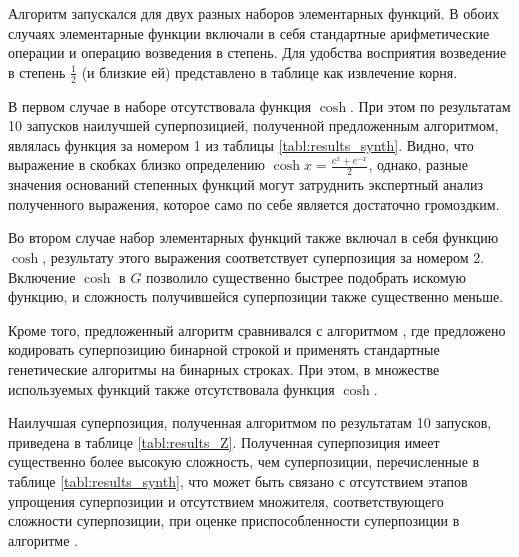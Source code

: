 \documentclass[12pt,a4paper]{article}
\begin{document}
Алгоритм запускался для двух разных наборов элементарных функций.
В обоих случаях элементарные функции включали в себя стандартные арифметические операции и
операцию возведения в степень. Для удобства восприятия возведение в степень
$\frac{1}{2}$ (и близкие ей) представлено в таблице как извлечение корня.

В первом случае в наборе отсутствовала функция $\cosh$. При этом по результатам
10 запусков наилучшей суперпозицией, полученной предложенным алгоритмом,
являлась функция за номером 1 из таблицы \ref{tabl:results_synth}. Видно, что выражение
в скобках близко определению $\cosh x = \frac{e^x + e^{-x}}{2}$,
однако, разные значения оснований степенных функций могут затруднить экспертный
анализ полученного выражения, которое само по себе является достаточно громоздким.

Во втором случае набор элементарных функций также включал в себя функцию
$\cosh$, результату этого выражения соответствует суперпозиция за номером 2.
Включение $\cosh$ в $G$ позволило существенно быстрее подобрать искомую функцию, и сложность
получившейся суперпозиции также существенно меньше.

Кроме того, предложенный алгоритм сравнивался с алгоритмом \cite{Zelinka2008},
где предложено кодировать суперпозицию бинарной строкой и применять стандартные
генетические алгоритмы на бинарных строках. При этом, в множестве используемых
функций также отсутствовала функция $\cosh$.

Наилучшая суперпозиция, полученная алгоритмом \cite{Zelinka2008} по результатам
10 запусков, приведена в таблице \ref{tabl:results_Z}. Полученная суперпозиция
имеет существенно более высокую сложность, чем суперпозиции, перечисленные в
таблице \ref{tabl:results_synth}, что может быть связано с отсутствием этапов упрощения
суперпозиции и отсутствием множителя, соответствующего сложности суперпозиции,
при оценке приспособленности суперпозиции в алгоритме \cite{Zelinka2008}.

\renewcommand{\thesubfigure}{\thefigure}
\makeatletter
  \renewcommand{\p@subfigure}{}
  \renewcommand{\@thesubfigure}{}
\makeatother
\end{document}
